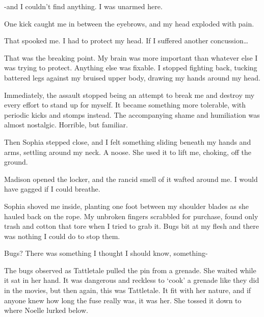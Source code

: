 \blacksquare



-and I couldn't find anything.  I was unarmed here.



One kick caught me in between the eyebrows, and my head exploded with pain.



That spooked me.  I had to protect my head.  If I suffered another concussion\ldots



That was the breaking point.  My brain was more important than whatever else I was trying to protect.  Anything else was fixable.  I stopped fighting back, tucking battered legs against my bruised upper body, drawing my hands around my head.



Immediately, the assault stopped being an attempt to break me and destroy my every effort to stand up for myself.  It became something more tolerable, with periodic kicks and stomps instead.  The accompanying shame and humiliation was almost nostalgic.  Horrible, but familiar.



Then Sophia stepped close, and I felt something sliding beneath my hands and arms, settling around my neck.  A noose.  She used it to lift me, choking, off the ground.



Madison opened the locker, and the rancid smell of it wafted around me.  I would have gagged if I could breathe.



Sophia shoved me inside, planting one foot between my shoulder blades as she hauled back on the rope.  My unbroken fingers scrabbled for purchase, found only trash and cotton that tore when I tried to grab it.  Bugs bit at my flesh and there was nothing I could do to stop them.



Bugs?  There was something I thought I should know, something-



\blacksquare



The bugs observed as Tattletale pulled the pin from a grenade.  She waited while it sat in her hand.  It was dangerous and reckless to `cook' a grenade like they did in the movies, but then again, this was Tattletale.  It fit with her nature, and if anyone knew how long the fuse really was, it was her.  She tossed it down to where Noelle lurked below.



